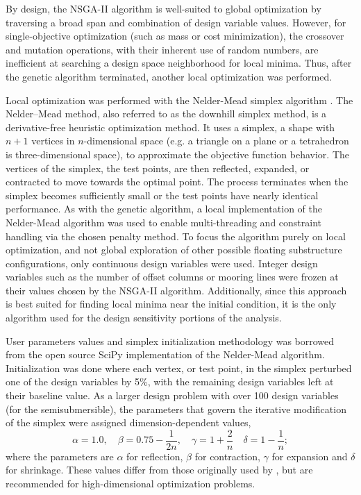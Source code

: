 By design, the NSGA-II algorithm is well-suited to global optimization
by traversing a broad span and combination of design variable values.
However, for single-objective optimization (such as mass or cost
minimization), the crossover and mutation operations, with their
inherent use of random numbers, are inefficient at searching a design
space neighborhood for local minima.  Thus, after the genetic algorithm
terminated, another local optimization was performed.

Local optimization was performed with the Nelder-Mead simplex algorithm
\citep{neldermead}.  The Nelder–Mead method, also referred to as the
downhill simplex method, is a derivative-free heuristic optimization
method.  It uses a simplex, a shape with $n+1$ vertices in
$n$-dimensional space (e.g. a triangle on a plane or a tetrahedron is
three-dimensional space), to approximate the objective function
behavior.  The vertices of the simplex, the test points, are then
reflected, expanded, or contracted to move towards the optimal point.
The process terminates when the simplex becomes sufficiently small or
the test points have nearly identical performance.  As with the genetic
algorithm, a local implementation of the Nelder-Mead algorithm was used
to enable multi-threading and constraint handling via the chosen penalty
method.  To focus the algorithm purely on local optimization, and not
global exploration of other possible floating substructure
configurations, only continuous design variables were used.  Integer
design variables such as the number of offset columns or mooring lines
were frozen at their values chosen by the NSGA-II algorithm.
Additionally, since this approach is best suited for finding local
minima near the initial condition, it is the only algorithm used for the
design sensitivity portions of the analysis.

User parameters values and simplex initialization methodology was
borrowed from the open source SciPy implementation of the Nelder-Mead
algorithm.  Initialization was done where each vertex, or test point, in
the simplex perturbed one of the design variables by 5\%, with the
remaining design variables left at their baseline value.  As a larger
design problem with over 100 design variables (for the semisubmersible),
the parameters that govern the iterative modification of the simplex
were assigned dimension-dependent values,
\begin{equation}
\alpha = 1.0, \quad \beta = 0.75 - \frac{1}{2n}, \quad \gamma = 1+\frac{2}{n} 
\quad \delta = 1 - \frac{1}{n};
\end{equation}
where the parameters are $\alpha$ for reflection, $\beta$ for
contraction, $\gamma$ for expansion and $\delta$ for shrinkage. These
values differ from those originally used by \citet{neldermead}, but are
recommended for high-dimensional optimization problems.


